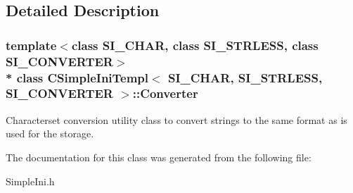 \subsection{Detailed Description}
\subsubsection*{template$<$class S\+I\+\_\+\+C\+H\+AR, class S\+I\+\_\+\+S\+T\+R\+L\+E\+SS, class S\+I\+\_\+\+C\+O\+N\+V\+E\+R\+T\+ER$>$\\*
class C\+Simple\+Ini\+Templ$<$ S\+I\+\_\+\+C\+H\+A\+R, S\+I\+\_\+\+S\+T\+R\+L\+E\+S\+S, S\+I\+\_\+\+C\+O\+N\+V\+E\+R\+T\+E\+R $>$\+::\+Converter}

Characterset conversion utility class to convert strings to the same format as is used for the storage. 

The documentation for this class was generated from the following file\+:\begin{DoxyCompactItemize}
\item 
Simple\+Ini.\+h\end{DoxyCompactItemize}
